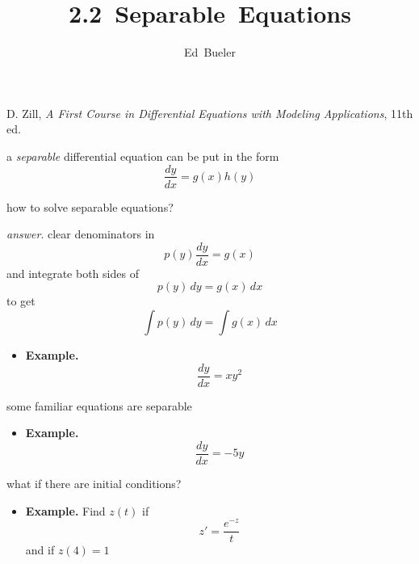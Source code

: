 \documentclass{beamer}
\title{\mbox{2.2 Separable Equations} \\ \phantom{foo}}
\date{%
}
\author{\mbox{Ed Bueler}}
\institute{\scriptsize Dept.~of Mathematics and Statistics \\ UAF}
\begin{document}
\begin{frame}
\titlepage

\vspace{30mm}
\tiny {\color{blue!30} D. Zill, \emph{A First Course in Differential Equations with Modeling Applications}, 11th ed.}
\end{frame}

\begin{frame}
a \emph{separable} differential equation can be put in the form
        $$\frac{dy}{dx} = g(x) h(y)$$
\end{frame}

\begin{frame}
how to solve separable equations?

\emph{answer}.  clear denominators in
    $$p(y) \frac{dy}{dx} = g(x)$$
and integrate both sides of 
    $$p(y)\,dy = g(x)\, dx$$
to get
    $$\int p(y)\,dy = \int g(x)\, dx$$
\end{frame}

\begin{frame}
\begin{itemize}
\item \textbf{Example.}
    $$\frac{dy}{dx} = x y^2$$
\end{itemize}
\end{frame}

\begin{frame}
some familiar equations are separable
\begin{itemize}
\item \textbf{Example.}
    $$\frac{dy}{dx} = - 5 y$$
\end{itemize}
\end{frame}

\begin{frame}
what if there are initial conditions?
\begin{itemize}
\item \textbf{Example.}  Find $z(t)$ if
    $$z' = \frac{e^{-z}}{t}$$
and if $z(4)=1$
\end{itemize}
\end{frame}
\end{document}
